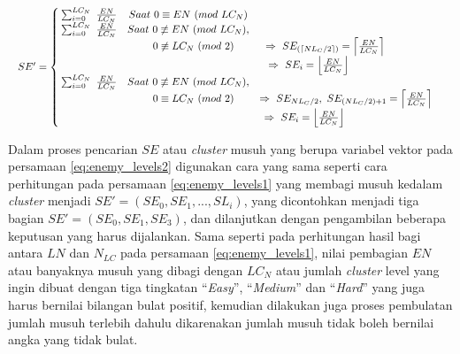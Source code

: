 \begin{equation}\label{eq:enemy_levels2}
\resizebox{\columnwidth}{!}{%
	$SE' = \left\{\begin{matrix}
	\hspace{0.2em} \sum_{i = 0}^{LC_{N}}\ \frac{EN}{LC_{N}} & Saat\ 0 \equiv EN\ (mod\ LC_{N}) & \\
	
	\hspace{0.2em} \sum_{i = 0}^{LC_{N}}\ \frac{EN}{LC_{N}} & Saat\ 0 \not\equiv EN\ (mod\ LC_{N}), & \\
	&\hspace{1.0em}  0 \not\equiv LC_{N}\ (mod\ 2) & \hspace{-4.0em} \Rightarrow\ SE_{(\left \lceil NL_{C}/2 \right \rceil)}  = \left \lceil \frac{EN}{LC_{N}} \right \rceil &\\
	
	& & \hspace{-7.2em} \Rightarrow\ SE_{i}  = \left \lfloor \frac{EN}{LC_{N}} \right \rfloor &\\
	
	\hspace{0.2em} \sum_{i = 0}^{LC_{N}}\ \frac{EN}{LC_{N}} & Saat\ 0 \not\equiv EN\ (mod\ LC_{N}), & \\
	&\hspace{1.0em}  0 \equiv LC_{N}\ (mod\ 2) & \Rightarrow\ SE_{NL_{C}/2},\ SE_{(NL_{C}/2) + 1}  = \left \lceil \frac{EN}{LC_{N}} \right \rceil &\\
	
	& & \hspace{-8.0em} \Rightarrow\ SE_{i}  = \left \lfloor \frac{EN}{LC_{N}} \right \rfloor &\\
	\end{matrix}\right.$%
}
\end{equation}

Dalam proses pencarian $SE$ atau \textit{cluster} musuh yang berupa variabel vektor pada persamaan \ref{eq:enemy_levels2} digunakan cara yang sama seperti cara perhitungan pada persamaan \ref{eq:enemy_levels1} yang membagi musuh kedalam \textit{cluster} menjadi $SE' = \left (SE_{0}, SE_{1}, ..., SL_{i} \right)$, yang dicontohkan menjadi tiga bagian $SE' = \left (SE_{0}, SE_{1}, SE_{3} \right )$, dan dilanjutkan dengan pengambilan beberapa keputusan yang harus dijalankan. Sama seperti pada perhitungan hasil bagi antara $LN$ dan $N_{LC}$ pada persamaan \ref{eq:enemy_levels1}, nilai pembagian $EN$ atau banyaknya musuh yang dibagi dengan $LC_{N}$ atau jumlah \textit{cluster} level yang ingin dibuat dengan tiga tingkatan ``\textit{Easy}'', ``\textit{Medium}'' dan ``\textit{Hard}'' yang juga harus bernilai bilangan bulat positif, kemudian dilakukan juga proses pembulatan jumlah musuh terlebih dahulu dikarenakan jumlah musuh tidak boleh bernilai angka yang tidak bulat. 
\vspace{1ex}

